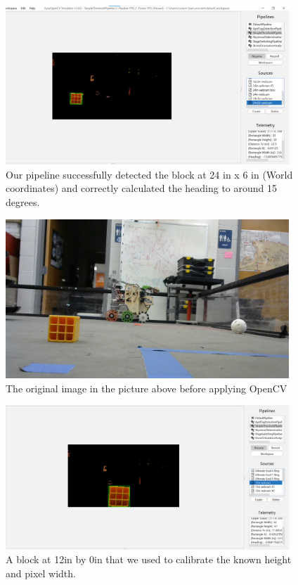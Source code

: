\begin{figure}[htp]
\centering
\includegraphics[width=0.95\textwidth, angle=0]{Meetings/March/03-29-22/03-29-22 1.png}
\caption{Our pipeline successfully detected the block at 24 in x 6 in (World coordinates) and correctly calculated the heading to around 15 degrees.}
\label{fig:032922_1}
\end{figure}

\begin{figure}[htp]
\centering
\includegraphics[width=0.95\textwidth, angle=0]{Meetings/March/03-29-22/03-29-22 2.jpg}
\caption{The original image in the picture above before applying OpenCV}
\label{fig:032922_2}
\end{figure}

\begin{figure}[htp]
\centering
\includegraphics[width=0.95\textwidth, angle=0]{Meetings/March/03-29-22/03-29-22 3.png}
\caption{A block at 12in by 0in that we used to calibrate the known height and pixel width.}
\label{fig:032922_3}
\end{figure}

